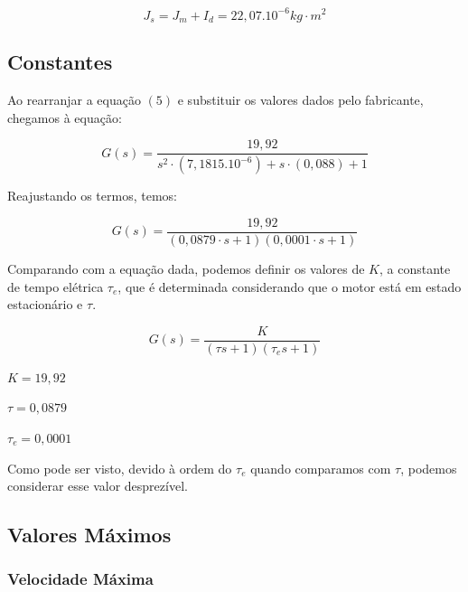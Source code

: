 \documentclass[12pt]{article}
\begin{document}
\begin{equation}
    J_s = J_m + I_d = 22,07.10^{-6} kg\cdot m^2
\end{equation}

\subsection{Constantes}

\quad Ao rearranjar a equação $(5)$ e substituir os valores dados pelo fabricante, chegamos à equação:

\begin{equation}
    G(s) = \frac{19,92}{s^2 \cdot (7,1815.10^{-6}) + s\cdot (0,088) + 1} 
\end{equation}

\quad Reajustando os termos, temos:

\begin{equation}
    G(s) = \frac{19,92}{(0,0879\cdot s + 1)(0,0001 \cdot s + 1)}
\end{equation}

\quad Comparando com a equação dada, podemos definir os valores de $K$, a constante de tempo elétrica $\tau_e$, que é determinada considerando que o motor está em estado estacionário e $\tau$.

\begin{equation}
    G(s) = \frac{K}{(\tau s + 1)(\tau_e s + 1)}
\end{equation}

\begin{center}
    $K = 19,92$
\end{center}

\begin{center}
    $\tau = 0,0879$
\end{center}

\begin{center}
    $\tau_e = 0,0001$
\end{center}

Como pode ser visto, devido à ordem do $\tau_e$ quando comparamos com $\tau$, podemos considerar esse valor desprezível. 

\subsection{Valores Máximos}

\subsubsection{Velocidade Máxima}
\end{document}
